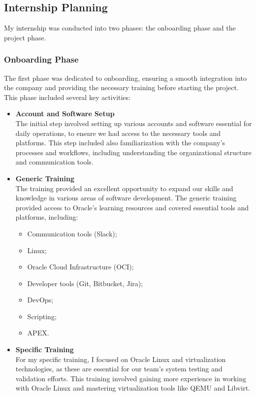 \subsection{Internship Planning}
My internship was conducted into two phases: the onboarding phase and the project phase.
\subsubsection[Onboarding Phase]{Onboarding Phase}
The first phase was dedicated to onboarding, ensuring a smooth integration into the company and providing the necessary training before starting the project. This phase included several key activities:

\begin{itemize}
    \item \textbf{Account and Software Setup }\\
          The initial step involved setting up various accounts and software essential for daily operations, to ensure we had access to the necessary tools and platforms. This step included also familiarization with the company’s processes and workflows, including understanding the organizational structure and communication tools.
    \item \textbf{Generic Training }\\
          The training provided an excellent opportunity to expand our skills and knowledge in various areas of software development.
          The generic training provided access to Oracle’s learning resources and covered essential tools and platforms, including:
          \begin{itemize}
              \item Communication tools (Slack);
              \item Linux;
              \item Oracle Cloud Infrastructure (OCI);
              \item Developer tools (Git, Bitbucket, Jira);
              \item DevOps;
              \item Scripting;
              \item APEX.
          \end{itemize}
    \item \textbf{Specific Training }\\
          For my specific training, I focused on Oracle Linux and virtualization technologies, as these are essential for our team’s system testing and validation efforts. This training involved gaining more experience in working with Oracle Linux and mastering virtualization tools like QEMU and Libvirt.
\end{itemize}
